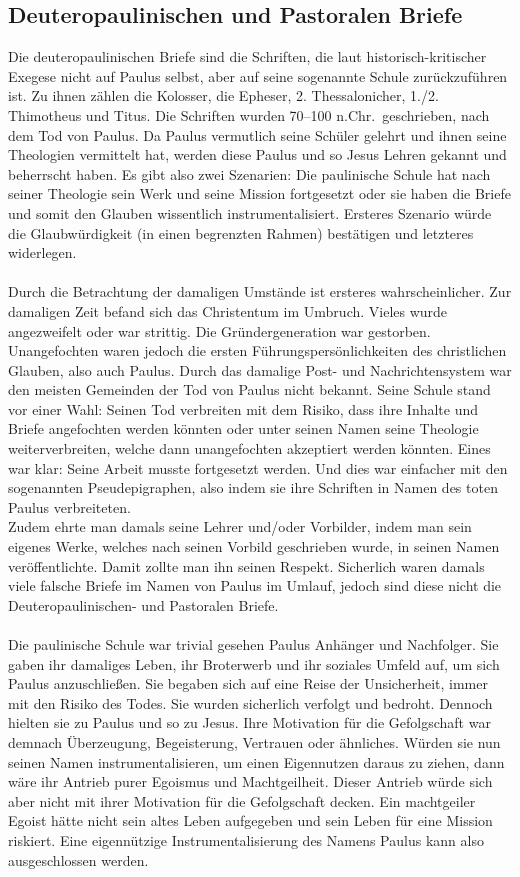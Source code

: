 \subsection*{Deuteropaulinischen und Pastoralen Briefe}
Die deuteropaulinischen Briefe sind die Schriften, die laut historisch-kritischer Exegese nicht auf Paulus selbst, aber auf seine sogenannte Schule zurückzuführen ist. Zu ihnen zählen die Kolosser, die Epheser, 2. Thessalonicher, 1./2. Thimotheus und Titus. Die Schriften wurden 70--100 n.Chr.\ geschrieben, nach dem Tod von Paulus. Da Paulus vermutlich seine Schüler gelehrt und ihnen seine Theologien vermittelt hat, werden diese Paulus und so Jesus Lehren gekannt und beherrscht haben. Es gibt also zwei Szenarien: Die paulinische Schule hat nach seiner Theologie sein Werk und seine Mission fortgesetzt oder sie haben die Briefe und somit den Glauben wissentlich instrumentalisiert. Ersteres Szenario würde die Glaubwürdigkeit (in einen begrenzten Rahmen) bestätigen und letzteres widerlegen.
\\~\\
Durch die Betrachtung der damaligen Umstände ist ersteres wahrscheinlicher. Zur damaligen Zeit befand sich das Christentum im Umbruch. Vieles wurde angezweifelt oder war strittig. Die Gründergeneration war gestorben. Unangefochten waren jedoch die ersten Führungspersönlichkeiten des christlichen Glauben, also auch Paulus. Durch das damalige Post- und Nachrichtensystem war den meisten Gemeinden der Tod von Paulus nicht bekannt. Seine Schule stand vor einer Wahl: Seinen Tod verbreiten mit dem Risiko, dass ihre Inhalte und Briefe angefochten werden könnten oder unter seinen Namen seine Theologie weiterverbreiten, welche dann unangefochten akzeptiert werden könnten. Eines war klar: Seine Arbeit musste fortgesetzt werden. Und dies war einfacher mit den sogenannten 				Pseudepigraphen, also indem sie ihre Schriften in Namen des toten Paulus verbreiteten.
\\
Zudem ehrte man damals seine Lehrer und/oder Vorbilder, indem man sein eigenes Werke, welches nach seinen Vorbild geschrieben wurde, in seinen Namen veröffentlichte. Damit zollte man ihn seinen Respekt. Sicherlich waren damals viele falsche Briefe im Namen von Paulus im Umlauf, jedoch sind diese nicht die Deuteropaulinischen- und Pastoralen Briefe.
\\~\\
Die paulinische Schule war trivial gesehen Paulus Anhänger und Nachfolger. Sie gaben ihr damaliges Leben, ihr Broterwerb und ihr soziales Umfeld auf, um sich Paulus anzuschließen. Sie begaben sich auf eine Reise der Unsicherheit, immer mit den Risiko des Todes. Sie wurden sicherlich verfolgt und bedroht. Dennoch hielten sie zu Paulus und so zu Jesus. Ihre Motivation für die Gefolgschaft war demnach Überzeugung, Begeisterung, Vertrauen oder ähnliches. Würden sie nun seinen Namen instrumentalisieren, um einen Eigennutzen daraus zu ziehen, dann wäre ihr Antrieb purer Egoismus und Machtgeilheit. Dieser Antrieb würde sich aber nicht mit ihrer Motivation für die Gefolgschaft decken. Ein machtgeiler Egoist hätte nicht sein altes Leben aufgegeben und sein Leben für eine Mission riskiert. Eine eigennützige Instrumentalisierung des Namens Paulus kann also ausgeschlossen werden.
